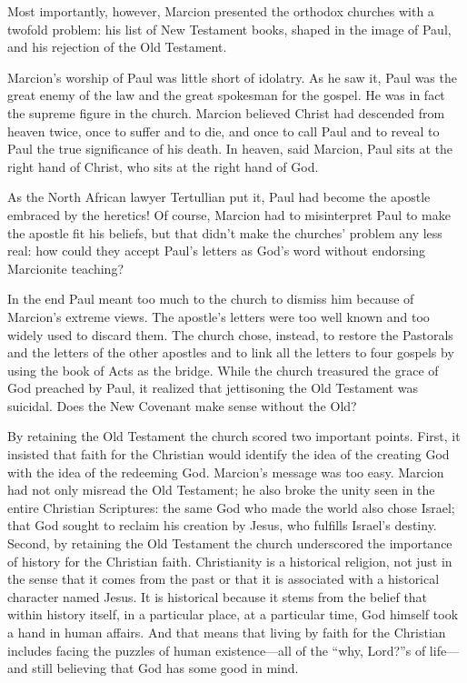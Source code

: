 Most importantly, however, Marcion presented the orthodox churches with a twofold problem: his list
of New Testament books, shaped in the image of Paul, and his rejection of the Old Testament.

Marcion’s worship of Paul was little short of idolatry. As he saw it, Paul was the great enemy of
the law and the great spokesman for the gospel. He was in fact the supreme figure in the church.
Marcion believed Christ had descended from heaven twice, once to suffer and to die, and once to call
Paul and to reveal to Paul the true significance of his death. In heaven, said Marcion, Paul sits at
the right hand of Christ, who sits at the right hand of God.

As the North African lawyer Tertullian put it, Paul had become the apostle embraced by the heretics!
Of course, Marcion had to misinterpret Paul to make the apostle fit his beliefs, but that didn’t
make the churches’ problem any less real: how could they accept Paul’s letters as God’s word without
endorsing Marcionite teaching?

In the end Paul meant too much to the church to dismiss him because of Marcion’s extreme views. The
apostle’s letters were too well known and too widely used to discard them. The church chose,
instead, to restore the Pastorals and the letters of the other apostles and to link all the letters
to four gospels by using the book of Acts as the bridge. While the church treasured the grace of God
preached by Paul, it realized that jettisoning the Old Testament was suicidal. Does the New Covenant
make sense without the Old?

By retaining the Old Testament the church scored two important points. First, it insisted that faith
for the Christian would identify the idea of the creating God with the idea of the redeeming God.
Marcion’s message was too easy. Marcion had not only misread the Old Testament; he also broke the
unity seen in the entire Christian Scriptures: the same God who made the world also chose Israel;
that God sought to reclaim his creation by Jesus, who fulfills Israel’s destiny. Second, by
retaining the Old Testament the church underscored the importance of history for the Christian
faith. Christianity is a historical religion, not just in the sense that it comes from the past or
that it is associated with a historical character named Jesus. It is historical because it stems
from the belief that within history itself, in a particular place, at a particular time, God himself
took a hand in human affairs. And that means that living by faith for the Christian includes facing
the puzzles of human existence—all of the “why, Lord?”s of life—and still believing that God has
some good in mind.

